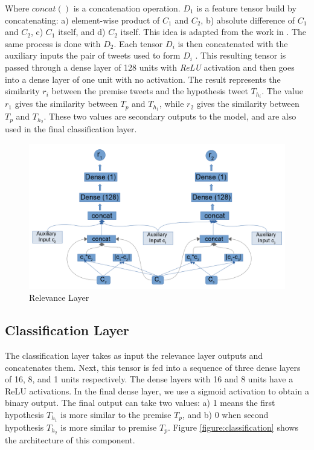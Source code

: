 \documentclass[12pt]{report}
\begin{document}
Where $concat()$ is a concatenation operation. 
$D_1$ is  a feature tensor build by concatenating: a) element-wise product of $C_1$ and $C_2$, b) absolute difference of $C_1$ and $C_2$, c) $C_1$ itself, 
and d) $C_2$ itself. This idea is adapted from the work in \cite{Conneau2017}. 
The same process is done with $D_2$. 
Each  tensor $D_i$ is then concatenated with the auxiliary inputs the pair of tweets used to form $D_i$ . This resulting tensor is passed through  a dense layer of 128 units with {\em \ac{ReLU}} activation and then goes into a dense layer of one unit with no activation. The result represents the similarity  $r_i$ between the premise  tweets  and the hypothesis tweet $T_{h_i}$.  The value $r_1$ gives the similarity between  $T_p$ and $T_{h_1}$, while $r_2$ gives the similarity between  $T_p$ and $T_{h_2}$.
These two values are secondary outputs to the model, and are also used in the final classification layer. 

\begin{figure}[H]	
	\centering
	\includegraphics[width=140mm, scale = 1]{images/14_relevance.png}	
	\caption{Relevance Layer}	
	\label{figure:relevance}
\end{figure}

\subsection{Classification Layer}

The classification layer takes as input the relevance layer outputs and concatenates them. Next, this tensor is fed into  a sequence of three dense layers of 16, 8, and 1 units respectively. The dense layers with 16 and 8 units have a \ac{ReLU} activations. In the final dense layer, we use a sigmoid activation to obtain a binary output. The final output can take two values: a) 1 means the first hypothesis $T_{h_1}$ is more similar to the premise $T_p$, and b) 0 when second hypothesis 
$T_{h_2}$ is more similar to premise $T_p$. Figure \ref{figure:classification} shows the architecture of this component.
\end{document}
